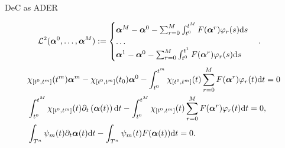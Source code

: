 \documentclass[aspectratio=169]{beamer}
\begin{document}
\begin{frame}{DeC as ADER}

\begin{align*}\label{eq:L2op}
\mathcal{L}^2(\boldsymbol{\alpha}^0, \dots, \boldsymbol{\alpha}^M) &:=
\begin{cases}
\boldsymbol{\alpha}^M-\boldsymbol{\alpha}^0 -\sum_{r=0}^M \int_{t^0}^{t^M} F(\boldsymbol{\alpha}^r) \varphi_r(s) {\mathrm{d}{s}}\\
\dots\\
\boldsymbol{\alpha}^1-\boldsymbol{\alpha}^0 - \sum_{r=0}^M \int_{t^0}^{t^1} F(\boldsymbol{\alpha}^r) \varphi_r(s) {\mathrm{d}{s}}
\end{cases}.
\end{align*}
\pause
\begin{align*}
&	\chi_{[t^0,t^{m}]}(t^m)\boldsymbol{\alpha}^m-\chi_{[t^0,t^{m}]}(t_0)\boldsymbol{\alpha}^0-  \int_{t^0}^{t^m} \chi_{[t^0,t^{m}]}(t)   \sum_{r=0}^M F(\boldsymbol{\alpha}^r)\varphi_r(t) {\mathrm{d}{t}}=0\\
 &\int_{t^0}^{t^M} \chi_{[t^0,t^{m}]}(t) \partial_t \left(\boldsymbol{\alpha}(t)\right) {\mathrm{d}{t}}-
 \int_{t^0}^{t^M} \chi_{[t^0,t^{m}]}(t) \sum_{r=0}^M  F(\boldsymbol{\alpha}^r) \varphi_r(t) {\mathrm{d}{t}}=0,\\
 &\int_{T^n} \psi_{m}(t) \partial_t \boldsymbol{\alpha}(t) {\mathrm{d}{t}}- \int_{T^n} \psi_{m}(t)
 F(\boldsymbol{\alpha}(t)) {\mathrm{d}{t}}=0. 
\end{align*}
\end{frame}
\end{document}
